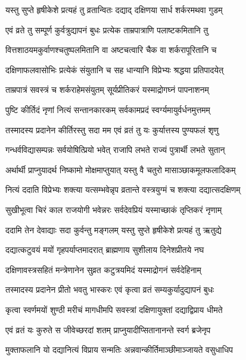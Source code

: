 \twolineshloka
{यस्तु सुप्ते हृषीकेशे प्रत्यहं तु व्रतान्वितः}
{दद्याद् दक्षिणया सार्ध शर्करमथवा गुडम्} %

\twolineshloka
{एवं व्रते तु सम्पूर्ण कुर्वत्रुद्यापनं बुधः}
{प्रत्येक ताम्रपात्राणि पलाष्टकमितानि तु} %

\twolineshloka
{वित्तशाठयमकुर्वाणश्चतुष्पलमितानि वा}
{अष्टचत्वारि चैक वा शर्करापूरितानि च} %

\twolineshloka
{दक्षिणाफलवासोभिः प्रत्येकं संयुतानि च}
{सह धान्यानि विप्रेभ्यः श्रद्धया प्रतिपादयेत्} %

\twolineshloka
{ताम्रपात्रं सवस्त्रं च शर्कराहेमसंयुतम्}
{सूर्यप्रीतिकरं यस्माद्रोगघ्नं पापनाशनम्} %

\twolineshloka
{पुष्टि कीर्तिदं नृणां नित्यं सन्तानकारकम्}
{सर्वकामप्रदं स्वर्ग्यमायुर्वर्धनमुत्तमम्} %

\twolineshloka
{तस्मादस्य प्रदानेन कीर्तिरस्तु सदा मम}
{एवं व्रतं तु यः कुर्यात्तस्य पुण्यफलं शृणु} %

\twolineshloka
{गन्धर्वविद्यासम्पन्नः सर्वयोषित्प्रियो भवेत्}
{राजापि लभते राज्यं पुत्रार्थी लभते सुतान्} %

\twolineshloka
{अर्थार्थी प्राप्नुयादर्थ निष्कामो मोक्षमाप्तुयात्}
{यस्तु वै चतुरो मासाञ्छाकमूलफलादिकम्} %

\twolineshloka
{नित्यं ददाति विप्रेभ्यः शक्त्या यत्सम्भवेन्नृप}
{व्रतान्ते वस्त्रयुग्मं च शक्त्या दद्यात्सदक्षिणम्} %

\twolineshloka
{सुखीभूत्वा चिरं काल राजयोगी भवेन्नरः}
{सर्वदेवप्रियं यस्माच्छाकं तृप्तिकरं नृणाम्} %

\twolineshloka
{ददामि तेन देवाद्याः सदा कुर्वन्तु मङ्गलम्}
{यस्तु सुप्ते हृषीकेशे प्रत्यहं तु ऋतुद्ये} %

\twolineshloka
{दद्यात्कटुवयं मयों गृहपर्याप्तमादरात्}
{ब्राह्मणाय सुशीलाय दिनेशप्रीतये नघ} %

\twolineshloka
{दक्षिणावस्त्रसहितं मन्त्रेणानेन सुव्रत}
{कटुत्रयमिदं यस्माद्रोगनं सर्वदेहिनाम्} %

\twolineshloka
{तस्मादस्य प्रदानेन प्रीतो भवतु भास्करः}
{एवं कृत्वा व्रतं सम्यकुर्यादुद्यापनं बुधः} %

\twolineshloka
{कृत्वा स्वर्णमयों शुण्ठी मरीचं मागधीमपि}
{सवस्त्रां दक्षिणायुक्तां दद्याद्विप्राय धीमते} %

\twolineshloka
{एवं व्रतं यः कुरुते स जीवेच्छरदां शतम्}
{प्राप्नुयादीप्सितानानन्ते स्वर्ग ब्रजेनृप} %

\twolineshloka
{मुक्ताफलानि यो दद्यानित्यं विप्राय सन्मतिः}
{अन्नवान्कीर्तिमाञ्छीमाञ्जायते वसुधाधिप} %

